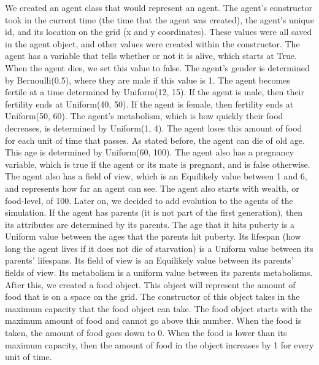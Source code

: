 \documentclass[11pt]{article}
\begin{document}
\begin{multicols}{2}
We created an agent class that would represent an agent. The agent's constructor took in the current time (the time that the agent was created), the agent's unique id, and its location on the grid (x and y coordinates). These values were all saved in the agent object, and other values were created within the constructor. The agent has a variable that tells whether or not it is alive, which starts at True. When the agent dies, we set this value to false. The agent's gender is determined by Bernoulli(0.5), where they are male if this value is 1. The agent becomes fertile at a time determined by Uniform(12, 15). If the agent is male, then their fertility ends at Uniform(40, 50). If the agent is female, then fertility ends at Uniform(50, 60). The agent's metabolism, which is how quickly their food decreases, is determined by Uniform(1, 4). The agent loses this amount of food for each unit of time that passes. As stated before, the agent can die of old age. This age is determined by Uniform(60, 100). The agent also has a pregnancy variable, which is true if the agent or its mate is pregnant, and is false otherwise. The agent also has a field of view, which is an Equilikely value between 1 and 6, and represents how far an agent can see.
The agent also starts with wealth, or food-level, of 100.
\newline
Later on, we decided to add evolution to the agents of the simulation. If the agent has parents (it is not part of the first generation), then its attributes are determined by its parents. The age that it hits puberty is a Uniform value between the ages that the parents hit puberty. Its lifespan (how long the agent lives if it does not die of starvation) is a Uniform value between its parents' lifespans. Its field of view is an Equilikely value between its parents' fields of view. Its metabolism is a uniform value between its parents metabolisms.
\newline
\newline
After this, we created a food object. This object will represent the amount of food that is on a space on the grid. The constructor of this object takes in the maximum capacity that the food object can take. The food object starts with the maximum amount of food and cannot go above this number. When the food is taken, the amount of food goes down to 0. When the food is lower than its maximum capacity, then the amount of food in the object increases by 1 for every unit of time.
\newline

\end{multicols}
\end{document}
